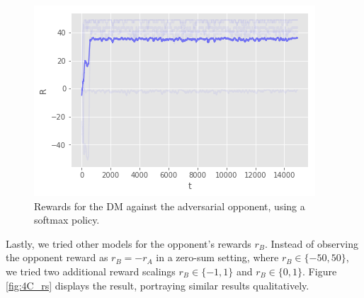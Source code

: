 \begin{figure}[h!]
\centering
\includegraphics[scale=0.5]{figures/softmax.png}%
\caption{Rewards for the DM against the adversarial opponent, using a softmax policy.}\label{fig:softmax}
\end{figure}

Lastly, we tried other models for the opponent's rewards $r_B$. Instead of observing the opponent reward as $r_B = -r_A$ in a zero-sum setting, where $r_B \in \lbrace -50, 50 \rbrace$,  we tried two additional reward scalings $r_B \in \lbrace -1, 1 \rbrace$ and $r_B \in \lbrace 0, 1 \rbrace $. Figure \ref{fig:4C_rs} displays the result, portraying
similar results qualitatively.

